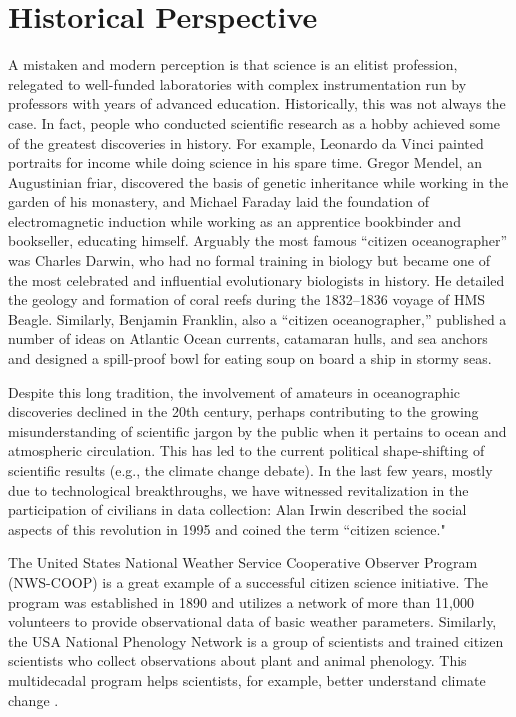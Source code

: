 \section{Historical Perspective}

A mistaken and modern perception is that science is an elitist profession, relegated to well-funded laboratories with complex instrumentation run by professors with years of advanced education. Historically, this was not always the case. In fact, people who conducted scientific research as a hobby achieved some of the greatest discoveries in history. For example, Leonardo da Vinci painted portraits for income while doing science in his spare time. Gregor Mendel, an Augustinian friar, discovered the basis of genetic inheritance while working in the garden of his monastery, and Michael Faraday laid the foundation of electromagnetic induction while working as an apprentice bookbinder and bookseller, educating himself. Arguably the most famous “citizen oceanographer” was Charles Darwin, who had no formal training in biology but became one of the most celebrated and influential evolutionary biologists in history. He detailed the geology and formation of coral reefs during the 1832–1836 voyage of HMS Beagle. Similarly, Benjamin Franklin, also a “citizen oceanographer,” published a number of ideas on Atlantic Ocean currents, catamaran hulls, and sea anchors and designed a spill-proof bowl for eating soup on board a ship in stormy seas.

Despite this long tradition, the involvement of amateurs in oceanographic discoveries declined in the 20th century, perhaps contributing to the growing misunderstanding of scientific jargon by the public when it pertains to ocean and atmospheric circulation. This has led to the current political shape-shifting of scientific results (e.g., the climate change debate). In the last few years, mostly due to technological breakthroughs, we have witnessed revitalization in the participation of civilians in data collection: Alan Irwin described the social aspects of this revolution in 1995 \cite{irwin1995citizen} and coined the term ``citizen science."

The United States National Weather Service Cooperative Observer Program (NWS-COOP) is a great example of a successful citizen science initiative. The program was established in 1890 and utilizes a network of more than 11,000 volunteers to provide observational data of basic weather parameters. Similarly, the USA National Phenology Network is a group of scientists and trained citizen scientists who collect observations about plant and animal phenology. This multidecadal program helps scientists, for example, better understand climate change \cite{ault2013false}.

